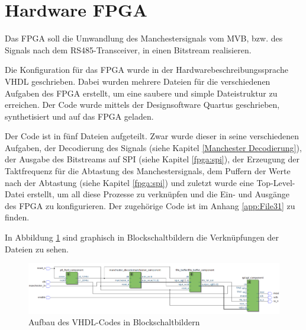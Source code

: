 


\section{Hardware FPGA}
\label{sec:HardwareFPGA}
Das FPGA soll die Umwandlung des Manchestersignals vom MVB, bzw. des Signals
nach dem RS485-Transceiver, in einen Bitstream realisieren. 

Die Konfiguration für das FPGA wurde in der Hardwarebeschreibungssprache VHDL geschrieben. Dabei wurden
mehrere Dateien für die verschiedenen Aufgaben des FPGA erstellt, um eine saubere und simple 
Dateistruktur zu erreichen. Der Code wurde mittels der Designsoftware Quartus geschrieben,
synthetisiert und auf das FPGA geladen.

Der Code ist in fünf Dateien aufgeteilt. Zwar wurde dieser in seine verschiedenen Aufgaben, der
Decodierung des Signals (siehe Kapitel \ref{Manchester Decodierung}), der Ausgabe des Bitstreams auf SPI
(siehe Kapitel \ref{fpga:spi}), der Erzeugung der Taktfrequenz für die Abtastung des Manchestersignals,
dem Puffern der Werte nach der Abtastung (siehe Kapitel \ref{fpga:spi}) und zuletzt wurde eine Top-Level-Datei erstellt, um all diese
Prozesse zu verknüpfen und die Ein- und Ausgänge des FPGA zu konfigurieren. Der zugehörige Code ist im Anhang \ref{app:File31} zu finden.

In Abbildung \ref{fig:AufbauFPGA} sind graphisch in Blockschaltbildern die Verknüpfungen der Dateien zu sehen.

\begin{figure}[H]
    \centering
    \includegraphics[width=1\linewidth]{Figures/Chap3/FPGA/FPGA_Darstellung_Projekt.png}
    \caption{Aufbau des VHDL-Codes in Blockschaltbildern}
    \label{fig:AufbauFPGA}
\end{figure}


